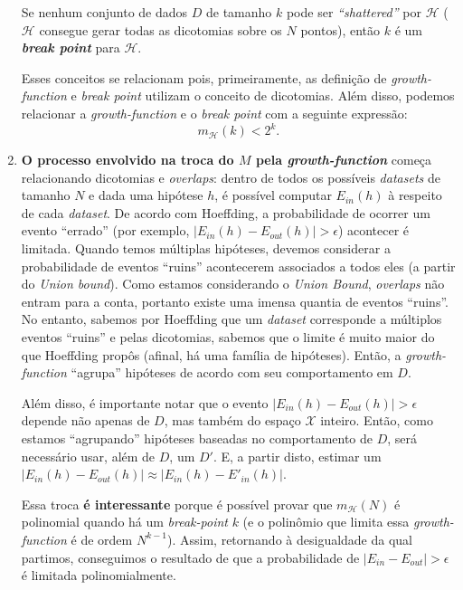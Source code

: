 \documentclass[a4paper,11pt]{article}
\begin{document}
\begin{enumerate}
        Se nenhum conjunto de dados $D$ de tamanho $k$ pode ser \textit{``shattered''} por $\mathcal{H}$ ($\mathcal{H}$ consegue gerar todas as dicotomias sobre os $N$ pontos), então $k$ é um \textbf{\textit{break point}} para $\mathcal{H}$.
        
        Esses conceitos se relacionam pois, primeiramente, as definição de \textit{growth-function} e \textit{break point} utilizam o conceito de dicotomias. Além disso, podemos relacionar a \textit{growth-function} e o \textit{break point} com a seguinte expressão:
        \[
            m_{\mathcal{H}}(k) < 2^k.
        \]
        
        \item \textbf{O processo envolvido na troca do $M$ pela \textit{growth-function}} começa relacionando dicotomias e \textit{overlaps}: dentro de todos os possíveis \textit{datasets} de tamanho $N$ e dada uma hipótese $h$, é possível computar $E_{in}(h)$ à respeito de cada \textit{dataset}. De acordo com Hoeffding, a probabilidade de ocorrer um evento ``errado'' (por exemplo, $|E_{in}(h) - E_{out}(h)| > \epsilon $) acontecer é limitada. Quando temos múltiplas hipóteses, devemos considerar a probabilidade de eventos ``ruins'' acontecerem associados a todos eles (a partir do \textit{Union bound}). Como estamos considerando o \textit{Union Bound}, \textit{overlaps} não entram para a conta, portanto existe uma imensa quantia de eventos ``ruins''. No entanto, sabemos por Hoeffding que um \textit{dataset} corresponde a múltiplos eventos ``ruins'' e pelas dicotomias, sabemos que o limite é muito maior do que Hoeffding propôs (afinal, há uma família de hipóteses). Então, a \textit{growth-function} ``agrupa'' hipóteses de acordo com  seu comportamento em $D$. 
        
        Além disso, é importante notar que o evento $|E_{in}(h) - E_{out}(h)| > \epsilon $ depende não apenas de $D$, mas também do espaço $\mathcal{X}$ inteiro. Então, como estamos ``agrupando'' hipóteses baseadas no comportamento de $D$, será necessário usar, além de $D$, um $D'$. E, a partir disto, estimar um $|E_{in}(h) - E_{out}(h)| \approx |E_{in}(h) - E'_{in}(h)|$.

        Essa troca \textbf{é interessante} porque é possível provar que $m_{\mathcal{H}}(N)$ é polinomial quando há um \textit{break-point} $k$ (e o polinômio que limita essa \textit{growth-function} é de ordem $N^{k-1}$). Assim, retornando à desigualdade da qual partimos, conseguimos o resultado de que a probabilidade de $| E_{in} - E_{out} | > \epsilon$ é limitada polinomialmente.
        

\end{enumerate}
\end{document}

